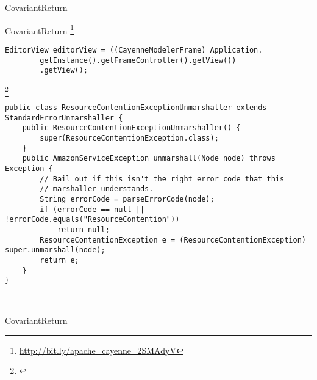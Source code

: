 \begin{pattern}{CovariantReturn}

\instances{}
CovariantReturn
\footnote{\url{http://bit.ly/apache_cayenne_2SMAdyV}}

\begin{verbatim}
EditorView editorView = ((CayenneModelerFrame) Application.
        getInstance().getFrameController().getView())
        .getView();
\end{verbatim}

\footnote{\url{}}

\begin{verbatim}
public class ResourceContentionExceptionUnmarshaller extends StandardErrorUnmarshaller {
    public ResourceContentionExceptionUnmarshaller() {
        super(ResourceContentionException.class);
    }
    public AmazonServiceException unmarshall(Node node) throws Exception {
        // Bail out if this isn't the right error code that this
        // marshaller understands.
        String errorCode = parseErrorCode(node);
        if (errorCode == null || !errorCode.equals("ResourceContention"))
            return null;
        ResourceContentionException e = (ResourceContentionException) super.unmarshall(node);
        return e;
    }
}

        
\end{verbatim}

\detection{}
    
\discussion{}
    
\related{} 

\end{pattern}{CovariantReturn}